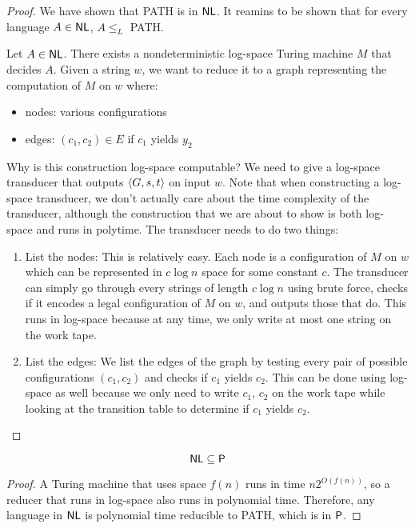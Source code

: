 \begin{proof}
    We have shown that PATH is in $\mathsf{NL}$. It reamins to be shown that for every language $A \in \mathsf{NL}$, $A \leq_L$ PATH.

    Let $A \in \mathsf{NL}$. There exists a nondeterministic log-space Turing machine $M$ that decides $A$. Given a string $w$, we want to reduce it to a graph representing the computation of $M$ on $w$ where:
    \begin{itemize}
        \item nodes: various configurations
        \item edges: $(c_1,c_2) \in E$ if $c_1$ yields $y_2$  
    \end{itemize}
    Why is this construction log-space computable? We need to give a log-space transducer that outputs $\langle G,s,t \rangle$ on input $w$. Note that when constructing a log-space transducer, we don't actually care about the time complexity of the transducer, although the construction that we are about to show is both log-space and runs in polytime. The transducer needs to do two things:

    \begin{enumerate}
        \item List the nodes: This is relatively easy. Each node is a configuration of $M$ on $w$ which can be represented in $c \log n$ space for some constant $c$. The transducer can simply go through every strings of length $c \log n$ using brute force, checks if it encodes a legal configuration of $M$ on $w$, and outputs those that do. This runs in log-space because at any time, we only write at most one string on the work tape.
        \item List the edges: We list the edges of the graph by testing every pair of possible configurations $(c_1,c_2)$ and checks if $c_1$ yields $c_2$. This can be done using log-space as well because we only need to write $c_1$, $c_2$ on the work tape while looking at the transition table to determine if $c_1$ yields $c_2$.
    \end{enumerate}
\end{proof}

\begin{corollary}
    $$
    \mathsf{NL} \subseteq \mathsf{P}
    $$
\end{corollary}

\begin{proof}
    A Turing machine that uses space $f(n)$ runs in time $n 2^{O(f(n))}$, so a reducer that runs in log-space also runs in polynomial time. Therefore, any language in $\mathsf{NL}$ is polynomial time reducible to PATH, which is in $\mathsf{P}$.
\end{proof}